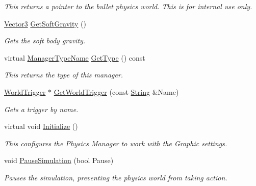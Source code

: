 \begin{DoxyCompactItemize}
\begin{DoxyCompactList}\small\item\em This returns a pointer to the bullet physics world. This is for internal use only. \item\end{DoxyCompactList}\item 
\hyperlink{classphys_1_1Vector3}{Vector3} \hyperlink{classphys_1_1PhysicsManager_acdaad0849c3d6386e8cff5c98fc46664}{GetSoftGravity} ()
\begin{DoxyCompactList}\small\item\em Gets the soft body gravity. \item\end{DoxyCompactList}\item 
virtual \hyperlink{classphys_1_1ManagerBase_aaa6ccddf23892eaccb898529414f80a5}{ManagerTypeName} \hyperlink{classphys_1_1PhysicsManager_a4d151cd24052ef3cccde6b66b8745be6}{GetType} () const 
\begin{DoxyCompactList}\small\item\em This returns the type of this manager. \item\end{DoxyCompactList}\item 
\hyperlink{classphys_1_1WorldTrigger}{WorldTrigger} $\ast$ \hyperlink{classphys_1_1PhysicsManager_a6d55d03e86909138587c0b36012ba4a6}{GetWorldTrigger} (const \hyperlink{namespacephys_aa03900411993de7fbfec4789bc1d392e}{String} \&Name)
\begin{DoxyCompactList}\small\item\em Gets a trigger by name. \item\end{DoxyCompactList}\item 
virtual void \hyperlink{classphys_1_1PhysicsManager_a28885be750bb763d957f122593815388}{Initialize} ()
\begin{DoxyCompactList}\small\item\em This configures the Physics Manager to work with the Graphic settings. \item\end{DoxyCompactList}\item 
void \hyperlink{classphys_1_1PhysicsManager_a107d5540a9bef91325807f77542c9176}{PauseSimulation} (bool Pause)
\begin{DoxyCompactList}\small\item\em Pauses the simulation, preventing the physics world from taking action. \item\end{DoxyCompactList}\item 

\end{DoxyCompactItemize}

